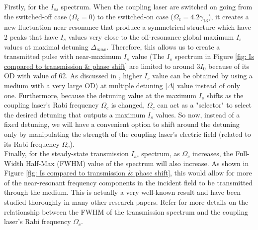 Firstly, for the $I_{ss}$ spectrum. When the coupling laser are switched on going from the switched-off case ($\Omega_{c} = 0$) to the switched-on case ($\Omega_{c} = 4.2\gamma_{13}$), it creates a new fluctuation near-resonance that produce a symmetrical structure which have 2 peaks that have $I_{s}$ values very close to the off-resonance global maximum $I_{s}$ values at maximal detuning $\Delta_{max}$. Therefore, this allows us to create a transmitted pulse with near-maximum $I_{s}$ value (The $I_{s}$ spectrum in Figure \ref{fig: Is compared to transmission & phase shift} are limited to around $3I_{0}$ because of its OD with value of 62. As discussed in \cite{Kwong2017}, higher $I_{s}$ value can be obtained by using a medium with a very large OD) at multiple detuning $|\Delta|$ value instead of only one. Furthermore, because the detuning value at the maximum $I_{s}$ shifts as the coupling laser's Rabi frequency $\Omega_{c}$ is changed, $\Omega_{c}$ can act as a "selector" to select the desired detuning that outputs a maximum $I_{s}$ values. So now, instead of a fixed detuning, we will have a convenient option to shift around the detuning only by manipulating the strength of the coupling laser's electric field (related to its Rabi frequency $\Omega_{c}$).\\

Finally, for the steady-state transmission $I_{ss}$ spectrum, as $\Omega_{c}$ increases, the Full-Width Half-Max (FWHM) value of the spectrum will also increase. As shown in Figure \ref{fig: Is compared to transmission & phase shift}, this would allow for more of the near-resonant frequency components in the incident field to be transmitted through the medium. This is actually a very well-known result and have been studied thoroughly in many other research papers. Refer \cite{} for more details on the relationship between the FWHM of the transmission spectrum and the coupling laser's Rabi frequency $\Omega_{c}$.

